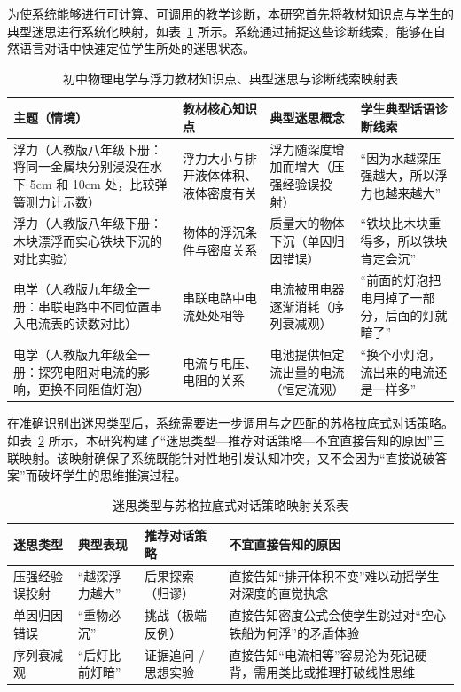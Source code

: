 为使系统能够进行可计算、可调用的教学诊断，本研究首先将教材知识点与学生的典型迷思进行系统化映射，如表~\ref{tab:knowledge-misconception} 所示。系统通过捕捉这些诊断线索，能够在自然语言对话中快速定位学生所处的迷思状态。

\begin{table}[htbp]
    \centering
    \caption{初中物理电学与浮力教材知识点、典型迷思与诊断线索映射表}
    \label{tab:knowledge-misconception}
    \begin{tabular}{lp{3.5cm}p{3.5cm}p{4cm}}
        \toprule
        \textbf{主题（情境）} & \textbf{教材核心知识点} & \textbf{典型迷思概念} & \textbf{学生典型话语诊断线索} \\
        \midrule
        浮力（人教版八年级下册：将同一金属块分别浸没在水下 5cm 和 10cm 处，比较弹簧测力计示数） & 浮力大小与排开液体体积、液体密度有关 & 浮力随深度增加而增大（压强经验误投射） & “因为水越深压强越大，所以浮力也越来越大” \\
        浮力（人教版八年级下册：木块漂浮而实心铁块下沉的对比实验） & 物体的浮沉条件与密度关系 & 质量大的物体下沉（单因归因错误） & “铁块比木块重得多，所以铁块肯定会沉” \\
        电学（人教版九年级全一册：串联电路中不同位置串入电流表的读数对比） & 串联电路中电流处处相等 & 电流被用电器逐渐消耗（序列衰减观） & “前面的灯泡把电用掉了一部分，后面的灯就暗了” \\
        电学（人教版九年级全一册：探究电阻对电流的影响，更换不同阻值灯泡） & 电流与电压、电阻的关系 & 电池提供恒定流出量的电流（恒定流观） & “换个小灯泡，流出来的电流还是一样多” \\
        \bottomrule
    \end{tabular}
\end{table}

在准确识别出迷思类型后，系统需要进一步调用与之匹配的苏格拉底式对话策略。如表~\ref{tab:strategy-mapping} 所示，本研究构建了“迷思类型—推荐对话策略—不宜直接告知的原因”三联映射。该映射确保了系统既能针对性地引发认知冲突，又不会因为“直接说破答案”而破坏学生的思维推演过程。

\begin{table}[htbp]
    \centering
    \caption{迷思类型与苏格拉底式对话策略映射关系表}
    \label{tab:strategy-mapping}
    \begin{tabular}{lp{3cm}p{3cm}p{4cm}}
        \toprule
        \textbf{迷思类型} & \textbf{典型表现} & \textbf{推荐对话策略} & \textbf{不宜直接告知的原因} \\
        \midrule
        压强经验误投射 & “越深浮力越大” & 后果探索（归谬） & 直接告知“排开体积不变”难以动摇学生对深度的直觉执念 \\
        单因归因错误 & “重物必沉” & 挑战（极端反例） & 直接告知密度公式会使学生跳过对“空心铁船为何浮”的矛盾体验 \\
        序列衰减观 & “后灯比前灯暗” & 证据追问 / 思想实验 & 直接告知“电流相等”容易沦为死记硬背，需用类比或推理打破线性思维 \\
        \bottomrule
    \end{tabular}
\end{table}

